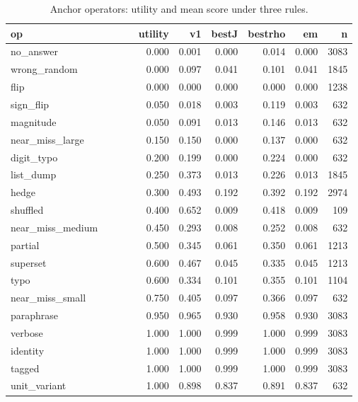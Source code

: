 \begin{table}[htbp]
\centering\tiny
\caption{Anchor operators: utility and mean score under three rules.}
\label{tab:anchor_operators}
\setlength{\tabcolsep}{3pt}
\begin{tabular}{p{0.572\linewidth}rrrrrr}
\toprule
op & utility & v1 & bestJ & bestrho & em & n \\
\midrule
no\_\allowbreak{}answer & 0.000 & 0.001 & 0.000 & 0.014 & 0.000 & 3083 \\
wrong\_\allowbreak{}random & 0.000 & 0.097 & 0.041 & 0.101 & 0.041 & 1845 \\
flip & 0.000 & 0.000 & 0.000 & 0.000 & 0.000 & 1238 \\
sign\_\allowbreak{}flip & 0.050 & 0.018 & 0.003 & 0.119 & 0.003 & 632 \\
magnitude & 0.050 & 0.091 & 0.013 & 0.146 & 0.013 & 632 \\
near\_\allowbreak{}miss\_\allowbreak{}large & 0.150 & 0.150 & 0.000 & 0.137 & 0.000 & 632 \\
digit\_\allowbreak{}typo & 0.200 & 0.199 & 0.000 & 0.224 & 0.000 & 632 \\
list\_\allowbreak{}dump & 0.250 & 0.373 & 0.013 & 0.226 & 0.013 & 1845 \\
hedge & 0.300 & 0.493 & 0.192 & 0.392 & 0.192 & 2974 \\
shuffled & 0.400 & 0.652 & 0.009 & 0.418 & 0.009 & 109 \\
near\_\allowbreak{}miss\_\allowbreak{}medium & 0.450 & 0.293 & 0.008 & 0.252 & 0.008 & 632 \\
partial & 0.500 & 0.345 & 0.061 & 0.350 & 0.061 & 1213 \\
superset & 0.600 & 0.467 & 0.045 & 0.335 & 0.045 & 1213 \\
typo & 0.600 & 0.334 & 0.101 & 0.355 & 0.101 & 1104 \\
near\_\allowbreak{}miss\_\allowbreak{}small & 0.750 & 0.405 & 0.097 & 0.366 & 0.097 & 632 \\
paraphrase & 0.950 & 0.965 & 0.930 & 0.958 & 0.930 & 3083 \\
verbose & 1.000 & 1.000 & 0.999 & 1.000 & 0.999 & 3083 \\
identity & 1.000 & 1.000 & 0.999 & 1.000 & 0.999 & 3083 \\
tagged & 1.000 & 1.000 & 0.999 & 1.000 & 0.999 & 3083 \\
unit\_\allowbreak{}variant & 1.000 & 0.898 & 0.837 & 0.891 & 0.837 & 632 \\
\bottomrule
\end{tabular}
\end{table}
